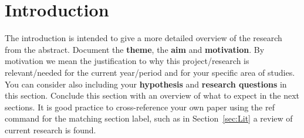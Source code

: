 \section{Introduction}
\label{sec:Int}
\par The introduction is intended to give a more detailed overview of the research from the abstract. Document the \textbf{theme}, the \textbf{aim} and \textbf{motivation}. By motivation we mean the justification to why this project/research is relevant/needed for the current year/period and for your specific area of studies. You can consider also including your \textbf{hypothesis} and \textbf{research questions} in this section. Conclude this section with an overview of what to expect in the next sections. It is good practice to cross-reference your own paper using the ref command for the matching section label, such as in Section~\ref{sec:Lit} a review of current research is found.